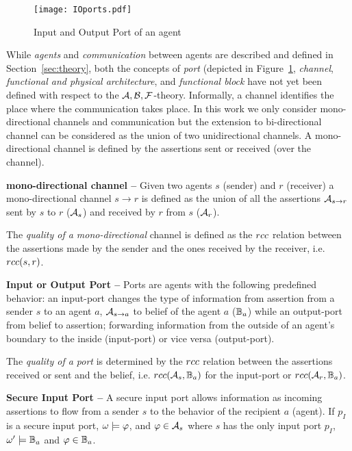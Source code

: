 \begin{figure}[t]
	\centering
	\texttt{[image: IOports.pdf]}
	\caption{Input and Output Port of an agent}
	\label{fig:ioports}
\end{figure}

While \emph{agents} and \emph{communication} between agents are described and
defined in Section~\ref{sec:theory}, both the concepts of \emph{port} (depicted in Figure~\ref{fig:ioports},
\emph{channel}, \emph{functional and physical architecture}, and
\emph{functional block} have not yet been defined with respect to the
$\mathcal{A},\mathcal{B},\mathcal{F}$-theory.  Informally, a channel identifies the place where the
communication takes place.  In this work we only consider mono-directional
channels and communication but the extension to bi-directional channel can be
considered as the union of two unidirectional channels. A mono-directional
channel is defined by the assertions sent or received (over the channel). 

\begin{definition}{\bf mono-directional channel --}\label{def:monochannel}
	Given two agents $s$ (sender) and $r$ (receiver) a
	mono-directional channel $s \rightarrow r$ is defined as the union of all the assertions 
	$\rassert{s}{r}$ sent by $s$ to $r$ ($\mathcal{A}_s$) and received by $r$ from $s$ ($\mathcal{A}_r$). 
\end{definition}
The \emph{quality of a mono-directional} channel is defined as the 
$rcc$ relation between the assertions made by the sender and the ones received by the receiver, i.e. $rcc(s,r)$.

\begin{definition}{\bf Input or Output Port --}\label{def:port} 
	Ports are agents with the following predefined behavior: an input-port changes
	the type of information from assertion from a sender $s$ to an agent $a$,
	$\rassert{s}{a}$ to belief of the agent $a$ ($\mathbb{B}_a$) while an
	output-port from belief to assertion; forwarding information from the outside
	of an agent's boundary to the inside (input-port) or vice versa (output-port). 
\end{definition}
The \emph{quality of a port} is determined by the $rcc$ relation between the 
assertions received or sent and the belief, i.e. $rcc(\mathcal{A}_s,\mathbb{B}_a)$ for the input-port
or $rcc(\mathcal{A}_r,\mathbb{B}_a)$.

\begin{definition}{\bf Secure Input Port --}\label{def:secport}
	A secure input port allows information as incoming assertions to flow
	from a sender $s$ to the behavior of the recipient $a$ (agent).  If $p_I$ is a secure input port,
	$\omega\models\varphi$, and $\varphi\in\mathcal{A}_s$ where $s$
	has the only input port $p_I$, $\omega'\models\mathbb{B}_a$ and $\varphi\in\mathbb{B}_a$.
\end{definition}

